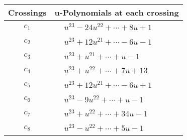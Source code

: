 \documentclass[1p]{elsarticle_modified}
\theoremstyle{definition}
\begin{document}
\begin{tabular}{m{50pt}|m{274pt}}
Crossings & \hspace{64pt}u-Polynomials at each crossing \\
\hline $$\begin{aligned}c_{1}\end{aligned}$$&$\begin{aligned}
&u^{23}-24 u^{22}+\cdots+8 u+1
\end{aligned}$\\
\hline $$\begin{aligned}c_{2}\end{aligned}$$&$\begin{aligned}
&u^{23}+12 u^{21}+\cdots-6 u-1
\end{aligned}$\\
\hline $$\begin{aligned}c_{3}\end{aligned}$$&$\begin{aligned}
&u^{23}+u^{21}+\cdots+u-1
\end{aligned}$\\
\hline $$\begin{aligned}c_{4}\end{aligned}$$&$\begin{aligned}
&u^{23}+u^{22}+\cdots+7 u+13
\end{aligned}$\\
\hline $$\begin{aligned}c_{5}\end{aligned}$$&$\begin{aligned}
&u^{23}+12 u^{21}+\cdots-6 u+1
\end{aligned}$\\
\hline $$\begin{aligned}c_{6}\end{aligned}$$&$\begin{aligned}
&u^{23}-9 u^{22}+\cdots+u-1
\end{aligned}$\\
\hline $$\begin{aligned}c_{7}\end{aligned}$$&$\begin{aligned}
&u^{23}+u^{22}+\cdots+34 u-1
\end{aligned}$\\
\hline $$\begin{aligned}c_{8}\end{aligned}$$&$\begin{aligned}
&u^{23}- u^{22}+\cdots+5 u-1
\end{aligned}$\\

\end{tabular}
\end{document}
